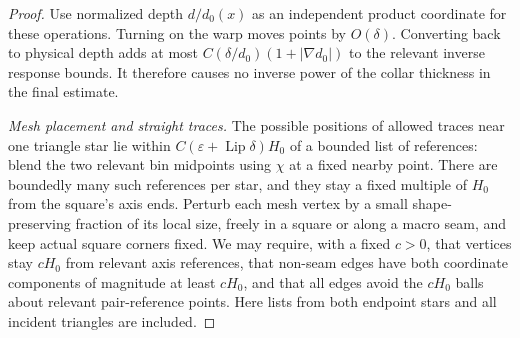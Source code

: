 \documentclass[11pt]{article}
\numberwithin{equation}{section}
\theoremstyle{definition}
\theoremstyle{remark}
\DeclareMathOperator{\Lip}{Lip}
\begin{document}
\begin{proof}
Use normalized depth $d/d_0(x)$ as an independent product coordinate
for these operations.  Turning on the warp moves points by $O(\delta)$.
Converting back to physical depth adds at most
$C(\delta/d_0)(1+|\nabla d_0|)$ to the relevant inverse response
bounds.  It therefore causes no inverse power of the collar thickness
in the final estimate.

\emph{Mesh placement and straight traces.}
The possible positions of allowed traces near one triangle star lie
within $C(\varepsilon+\Lip\delta)H_0$ of a bounded list of
references: blend the two relevant bin midpoints using $\chi$ at a
fixed nearby point.  There are boundedly many such references per
star, and they stay a fixed multiple of $H_0$ from the square's axis
ends.  Perturb each mesh vertex by a small shape-preserving fraction
of its local size, freely in a square or along a macro seam, and keep
actual square corners fixed.  We may require, with a fixed $c>0$,
that vertices stay $cH_0$ from relevant axis references, that
non-seam edges have both coordinate components of magnitude at
least $cH_0$, and that all edges avoid the $cH_0$ balls about relevant
pair-reference points.  Here lists from both endpoint stars and all
incident triangles are included.


\end{proof}
\end{document}
